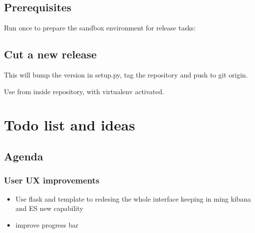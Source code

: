 \documentclass[letterpaper,10pt,english]{sphinxmanual}
\begin{document}
\subsection{Prerequisites}
\label{\detokenize{release:prerequisites}}
Run once to prepare the sandbox environment for release tasks:

\begin{sphinxVerbatim}[commandchars=\\\{\}]
 
\end{sphinxVerbatim}


\subsection{Cut a new release}
\label{\detokenize{release:cut-a-new-release}}
This will bump the version in setup.py, tag the repository and push to git origin.

Use from inside repository, with virtualenv activated.

\begin{sphinxVerbatim}[commandchars=\\\{\}]
  
\end{sphinxVerbatim}


\section{Todo list and ideas}
\label{\detokenize{todo:todo-list-and-ideas}}\label{\detokenize{todo::doc}}

\subsection{Agenda}
\label{\detokenize{todo:agenda}}

\subsubsection{User UX improvements}
\label{\detokenize{todo:user-ux-improvements}}\begin{itemize}
\item {} 
Use flask and template to redesing the whole interface keeping in ming kibana and ES new capability

\item {} 
improve progress bar

\end{itemize}
\end{document}

